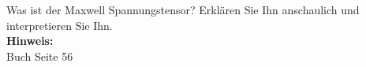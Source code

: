 \begin{question}[section=2,subsection=23,name={Maxwell Spannungstensor},difficulty=4,type=mdl,tags={}]
	Was ist der Maxwell Spannungstensor? Erklären Sie Ihn anschaulich und interpretieren Sie Ihn.
	\\ \textbf{Hinweis:}\\
	Buch Seite 56
\end{question}
\begin{solution}
	
\end{solution}